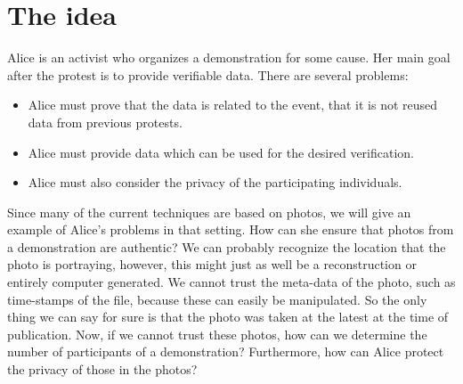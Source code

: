 \mode*
\section{The idea}%
\label{TheIdea}

Alice is an activist who organizes a demonstration for some cause.
Her main goal after the protest is to provide verifiable data.
There are several problems:
\begin{frame}
\begin{itemize}
  \item Alice must prove that the data is related to the event, that it is not 
    reused data from previous protests.
  \item Alice must provide data which can be used for the desired verification.
  \item Alice must also consider the privacy of the participating individuals.
\end{itemize}
\end{frame}
Since many of the current techniques are based on photos, we will give an 
example of Alice's problems in that setting.
How can she ensure that photos from a demonstration are authentic?
We can probably recognize the location that the photo is portraying, however, 
this might just as well be a reconstruction or entirely computer generated.
We cannot trust the meta-data of the photo, such as time-stamps of the file, 
because these can easily be manipulated.
So the only thing we can say for sure is that the photo was taken at the latest 
at the time of publication.
Now, if we cannot trust these photos, how can we determine the number of 
participants of a demonstration?
Furthermore, how can Alice protect the privacy of those in the photos?

%
%
%

